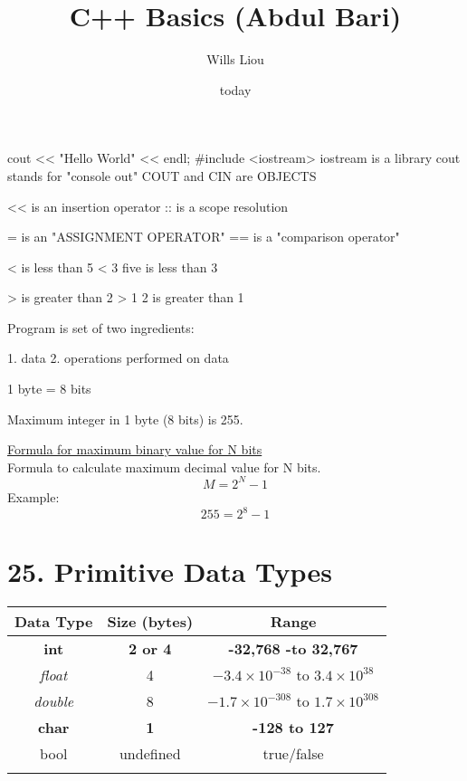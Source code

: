 \documentclass{article}
\title{C++ Basics (Abdul Bari)}
\author{Wills Liou}
\date{today}
\begin{document}
 cout << "Hello World" << endl;	 
	\#include <iostream>
	iostream is a library
	cout stands for "console out"
	COUT and CIN are OBJECTS
		
	
	<< is an insertion operator
	:: is a scope resolution
	
	= is an "ASSIGNMENT OPERATOR"
	== is a "comparison operator"
	
	< is less than
	5 < 3    five is less than 3
	
	> is greater than
	2 > 1
	2 is greater than 1
	
	Program is set of two ingredients: 
		
	1. data
	2. operations performed on data


	1 byte = 8 bits
	
	Maximum integer in 1 byte (8 bits) is 255.
	
	\href{https://www.sciencedirect.com/topics/engineering/binary-word}{Formula for maximum binary value for N bits} \\
	Formula to calculate maximum decimal value for N bits.
		$$M = 2^{N} - 1$$
	Example:	
		$$255 = 2^{8} - 1$$


\chapter{25. Primitive Data Types}

\begin{table}[]
\begin{tabular}{ccc}
\hline
{Data Type}               & {Size (bytes) }               & {Range}               \\ \hline
\textbf{int}            & \textbf{2 or 4}            & \textbf{-32,768 -to 32,767}      \label{int}   \\ 
\textit{float}                    &4                      &$-3.4 \times 10^{-38}$ to $3.4 \times 10^{38}$     \label{float}             \\
\textit{double}                     &8                      & $-1.7 \times 10^{-308}$ to $1.7 \times 10^{308}$       \label{double}     \\ \hline
\textbf{char}            & \textbf{1}            & \textbf{-128 to 127}            \\
bool                     &undefined                      &true/false                      \\
\multicolumn{1}{l}{} & \multicolumn{1}{l}{} & \multicolumn{1}{l}{} 
\end{tabular}
\end{table}
\end{document}
